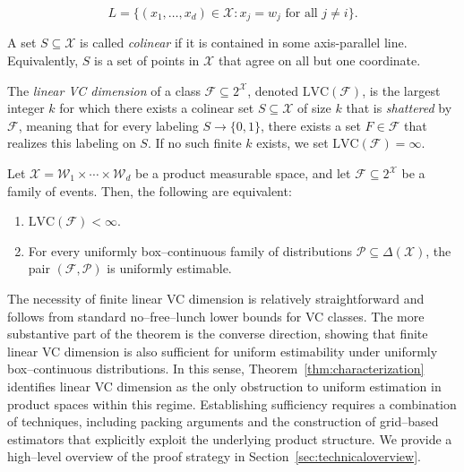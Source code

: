 \documentclass[arxiv]{colt2026}
\newcommand{\X}{\mathcal{X}}
\newcommand{\F}{\mathcal{F}}
\newcommand{\W}{\mathcal{W}}
\newcommand{\Pc}{\mathcal{P}}
\newcommand{\LVC}{\mathrm{LVC}}
\begin{document}
\vspace{-0.5em}
\[
L = \bigl\{ (x_1,\ldots,x_d) \in \X : x_j = w_j \text{ for all } j \neq i \bigr\}.
\]

\vspace{-0.3em}
 A set $S \subseteq \X$ is called \emph{colinear} if it is contained in some 
 axis-parallel line. Equivalently, $S$ is a set of points in $\X$ that agree on all but one coordinate.

\vspace{-0.5em}
\begin{definition}
\label{def:lvc}
The \emph{linear VC dimension} of a class $\F \subseteq 2^{\X}$, denoted $\LVC(\F)$, is the
largest integer $k$ for which there exists a colinear set $S \subseteq \X$ of size $k$
that is \emph{shattered} by $\F$, meaning that for every labeling $S \to \{0,1\}$,
there exists a set $F \in \F$ that realizes this labeling on $S$.
If no such finite $k$ exists, we set $\LVC(\F) = \infty$.
\end{definition}

\vspace{-1em}
\begin{mdframed}[
  backgroundcolor=gray!10,
  linecolor=gray!50,
  linewidth=0.6pt,
  roundcorner=6pt,
  innertopmargin=1em,
  innerbottommargin=1em
]
\begin{theorem}
\label{thm:characterization}
Let $\X = \W_1 \times \cdots \times \W_d$ be a product measurable space, and let
$\F \subseteq 2^{\X}$ be a family of events.
Then, the following are equivalent:
\begin{enumerate}
\item $\LVC(\F) < \infty$.
\item For every uniformly box--continuous family of distributions
$\Pc \subseteq \Delta(\X)$, the pair $(\F,\Pc)$ is uniformly estimable.
\end{enumerate}
\end{theorem}
\end{mdframed}

The necessity of finite linear VC dimension is relatively straightforward and follows from standard no--free--lunch lower bounds for VC classes.
The more substantive part of the theorem is the converse direction, showing that finite linear VC dimension is also sufficient for uniform estimability under uniformly box--continuous distributions.
In this sense, Theorem~\ref{thm:characterization} identifies linear VC dimension as the only obstruction to uniform estimation in product spaces within this regime.
Establishing sufficiency requires a combination of techniques, including packing arguments and the construction of grid--based estimators that explicitly exploit the underlying product structure.
We provide a high--level overview of the proof strategy in Section~\ref{sec:technicaloverview}.
\end{document}

